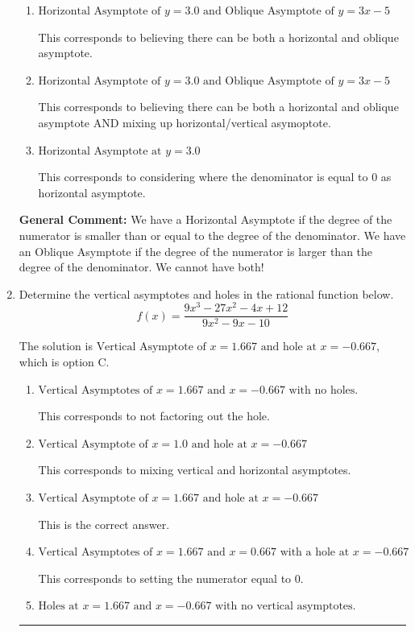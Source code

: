 \documentclass{extbook}[14pt]
\newcommand{\litem}[1]{\item #1

\rule{\textwidth}{0.4pt}}
\begin{document}
\begin{enumerate}
{\begin{enumerate}[label=\Alph*.]
This corresponds to using rule for Horizontal Asymptote when degree of numerator and denominator match.
\item \( \text{Horizontal Asymptote of } y = 3.0 \text{ and Oblique Asymptote of } y = 3x -5 \)

This corresponds to believing there can be both a horizontal and oblique asymptote.
\item \( \text{Horizontal Asymptote of } y = 3.0 \text{ and Oblique Asymptote of } y = 3x -5 \)

This corresponds to believing there can be both a horizontal and oblique asymptote AND mixing up horizontal/vertical asymoptote.
\item \( \text{Horizontal Asymptote at } y = 3.0 \)

This corresponds to considering where the denominator is equal to 0 as horizontal asymptote.
\end{enumerate}

\textbf{General Comment:} We have a Horizontal Asymptote if the degree of the numerator is smaller than or equal to the degree of the denominator. We have an Oblique Asymptote if the degree of the numerator is larger than the degree of the denominator. We cannot have both!
}
\litem{
Determine the vertical asymptotes and holes in the rational function below.
\[ f(x) = \frac{9x^{3} -27 x^{2} -4 x + 12}{9x^{2} -9 x -10} \]

The solution is \( \text{Vertical Asymptote of } x = 1.667 \text{ and hole at } x = -0.667 \), which is option C.\begin{enumerate}[label=\Alph*.]
\item \( \text{Vertical Asymptotes of } x = 1.667 \text{ and } x = -0.667 \text{ with no holes.} \)

This corresponds to not factoring out the hole.
\item \( \text{Vertical Asymptote of } x = 1.0 \text{ and hole at } x = -0.667 \)

This corresponds to mixing vertical and horizontal asymptotes.
\item \( \text{Vertical Asymptote of } x = 1.667 \text{ and hole at } x = -0.667 \)

This is the correct answer.
\item \( \text{Vertical Asymptotes of } x = 1.667 \text{ and } x = 0.667 \text{ with a hole at } x = -0.667 \)

This corresponds to setting the numerator equal to 0.
\item \( \text{Holes at } x = 1.667 \text{ and } x = -0.667 \text{ with no vertical asymptotes.} \)


\end{enumerate}}
\end{enumerate}
\end{document}
